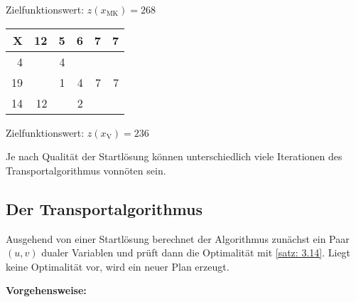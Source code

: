\begin{beispiel}
	Zielfunktionswert: $z(x_{\text{MK}}) = 268$

	\vspace{\parskip}
	
	\begin{center}
		\begin{tabular}{r|rrrrr}
			X & 12 &  5 &  6 &  7 &  7 \\ \hline
			4 &  &  4 &  &   &   \\
			19 &  & 1 & 4 &  7 &  7 \\
			14 &  12 &  &  2 &   & 
		\end{tabular}
	\end{center}
	Zielfunktionswert: $z(x_{\text{V}}) = 236$
\end{beispiel}

Je nach Qualität der Startlösung können unterschiedlich viele Iterationen des Transportalgorithmus vonnöten sein.

\subsection{Der Transportalgorithmus}

Ausgehend von einer Startlösung berechnet der Algorithmus zunächst ein Paar $(u,v)$ dualer Variablen und prüft dann die Optimalität mit \cref{satz: 3.14}. Liegt keine Optimalität vor, wird ein neuer Plan erzeugt.

\textbf{Vorgehensweise:}

